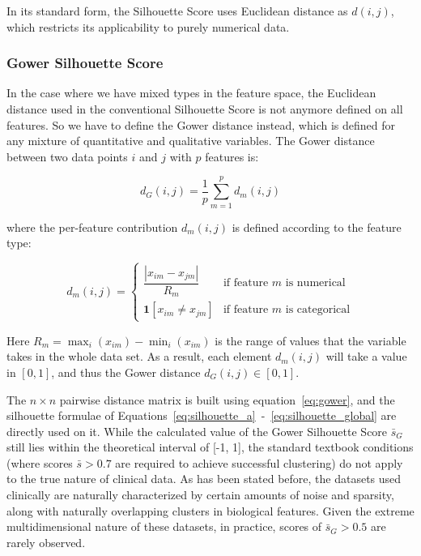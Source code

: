 In its standard form, the Silhouette Score uses Euclidean distance as $d(i,j)$, which restricts its applicability to purely numerical data.

\subsubsection*{Gower Silhouette Score}
\label{ch:gower}

In the case where we have mixed types in the feature space, the Euclidean distance used in the conventional Silhouette Score is not anymore defined on all features. So we have to define the Gower distance \cite{gower1971} instead, which is defined for any mixture of quantitative and qualitative variables. The Gower distance between two data points $i$ and $j$ with $p$ features is:

\begin{equation}
    d_G(i, j) = \frac{1}{p} \sum_{m=1}^{p} d_m(i, j)
    \label{eq:gower}
\end{equation}

where the per-feature contribution $d_m(i, j)$ is defined according to the feature type:

\begin{equation}
    d_m(i, j) =
    \begin{cases}
        \dfrac{|x_{im} - x_{jm}|}{R_m} & \text{if feature } m \text{ is numerical} \\[8pt]
        \mathbf{1}[x_{im} \neq x_{jm}]  & \text{if feature } m \text{ is categorical}
    \end{cases}
    \label{eq:gower_dm}
\end{equation}

Here $R_m=\max_i(x_{im})-\min_i(x_{im})$ is the range of values that the variable takes in the whole data set. As a result, each element $d_m(i,j)$ will take a value in $[0,1]$, and thus the Gower distance $d_G(i,j)\in[0,1]$.

The $n\times n$ pairwise distance matrix is built using equation~\eqref{eq:gower}, and the silhouette formulae of Equations~\eqref{eq:silhouette_a}~-~\eqref{eq:silhouette_global} are directly used on it. While the calculated value of the Gower Silhouette Score $\bar{s}_G$ still lies within the theoretical interval of [-1, 1], the standard textbook conditions (where scores $\bar{s} > 0.7$ are required to achieve successful clustering) do not apply to the true nature of clinical data. As has been stated before, the datasets used clinically are naturally characterized by certain amounts of noise and sparsity, along with naturally overlapping clusters in biological features. Given the extreme multidimensional nature of these datasets, in practice, scores of $\bar{s}_G > 0.5$ are rarely observed.

